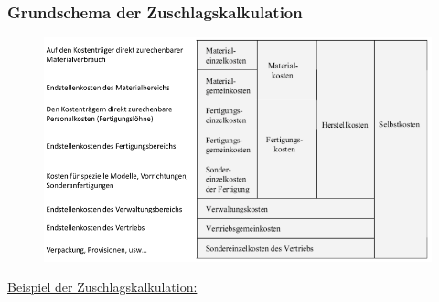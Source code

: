 \documentclass[a4paper,11pt, twoside]{article}
\begin{document}
\subsubsection*{Grundschema der Zuschlagskalkulation}

\begin{figure}[h]
 \begin{center}
   \includegraphics[scale=0.5]{bilder/grundschema_zuschlagskalkulation.png}
 \end{center}
\end{figure}

\underline{Beispiel der Zuschlagskalkulation:}
\end{document}
